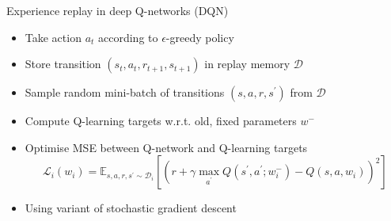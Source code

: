 \bgroup
\begin{frame}{Experience replay in deep Q-networks (DQN)}
\begin{itemize}
\item Take action $a_t$ according to $\epsilon$-greedy policy
\item Store transition $(s_t, a_t, r_{t+1}, s_{t+1})$ in replay memory $\mathcal{D}$
\item Sample random mini-batch of transitions $(s, a, r, s^{\prime})$ from $\mathcal{D}$
\item Compute Q-learning targets w.r.t. old, fixed parameters $w^{-}$
\item Optimise MSE between Q-network and Q-learning targets
\begin{equation*}
\mathcal{L}_i(w_i)=\mathbb{E}_{s,a,r,s^{\prime}\sim\mathcal{D}_i}\left[\left(r + \gamma \max_{a^{\prime}}Q(s^{\prime}, a^{\prime};w_i^{-}) - Q(s, a, w_i)\right)^2\right]
\end{equation*}
\item Using variant of stochastic gradient descent
\end{itemize}
\end{frame}
\egroup